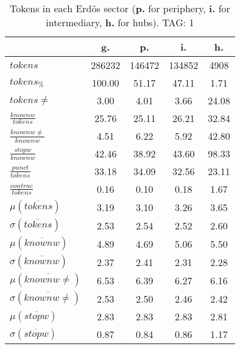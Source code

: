 \begin{table}[h!]
\begin{center}
\begin{tabular}{| l || c | c | c | c |}\hline
 & {\bf g.} & {\bf p.} & {\bf i.} & {\bf h.} \\\hline\hline
$tokens$ & 286232  & 146472  & 134852  & 4908 \\
$tokens_{\%}$ & 100.00  & 51.17  & 47.11  & 1.71 \\
$tokens \neq$ & 3.00  & 4.01  & 3.66  & 24.08 \\\hline
$\frac{knownw}{tokens}$ & 25.76  & 25.11  & 26.21  & 32.84 \\
$\frac{knownw \neq}{knownw}$ & 4.51  & 6.22  & 5.92  & 42.80 \\\hline
$\frac{stopw}{knownw}$ & 42.46  & 38.92  & 43.60  & 98.33 \\
$\frac{punct}{tokens}$ & 33.18  & 34.09  & 32.56  & 23.11 \\
$\frac{contrac}{tokens}$ & 0.16  & 0.10  & 0.18  & 1.67 \\\hline\hline
$\mu(\overline{tokens})$ & 3.19  & 3.10  & 3.26  & 3.65 \\
$\sigma(\overline{tokens})$ & 2.53  & 2.54  & 2.52  & 2.60 \\\hline
$\mu(\overline{knownw})$ & 4.89  & 4.69  & 5.06  & 5.50 \\
$\sigma(\overline{knownw})$ & 2.37  & 2.41  & 2.31  & 2.28 \\\hline
$\mu(\overline{knownw \neq})$ & 6.53  & 6.39  & 6.27  & 6.16 \\
$\sigma(\overline{knownw \neq})$ & 2.53  & 2.50  & 2.46  & 2.42 \\\hline
$\mu(\overline{stopw})$ & 2.83  & 2.83  & 2.83  & 2.81 \\
$\sigma(\overline{stopw})$ & 0.87  & 0.84  & 0.86  & 1.17 \\\hline
\end{tabular}
	\caption{Tokens in each Erd\"os sector ({{\bf p.}} for periphery, {{\bf i.}} for intermediary, {{\bf h.}} for hubs). TAG: 1}\label{tab:tokensInline}
\end{center}
\end{table}
